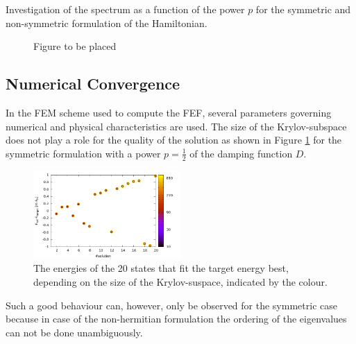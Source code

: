 Investigation of the spectrum as a function of the power $p$ for the symmetric and non-symmetric formulation of the Hamiltonian.
\begin{figure}
\caption{Figure to be placed}
\end{figure}

\subsection{Numerical Convergence}
In the FEM scheme used to compute the FEF, several parameters governing numerical and physical characteristics are used.
The size of the Krylov-subspace does not play a role for the quality of the solution as shown in Figure \ref{fig:E_nev} for the symmetric formulation with a power $p=\frac 12$ of the damping function $D$.
\begin{figure}
\includegraphics[width=0.5\textwidth]{Figures/Root_E_nev.pdf}
\caption{The energies of the 20 states that fit the target energy best, depending on the
size of the Krylov-suspace, indicated by the colour.}
\label{fig:E_nev}
\end{figure}
Such a good behaviour can, however, only be observed for the symmetric case because in case of the non-hermitian formulation the ordering of the eigenvalues can not be done unambiguously.

